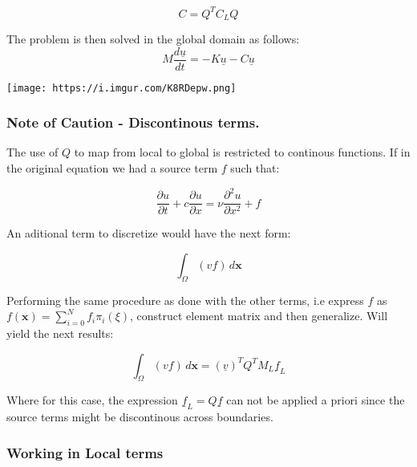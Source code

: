 \documentclass[
  a4paper,
  10pt]{article}
\begin{document}
\begin{equation}
C = Q^{T}C_LQ    
\end{equation}

The problem is then solved in the global domain as follows:
\begin{equation}
M\frac{d\underline{u}}{dt}=-K\underline{u}-C\underline{u}
\end{equation}

\texttt{[image: https://i.imgur.com/K8RDepw.png]}

\hypertarget{note-of-caution---discontinous-terms.}{%
\subsubsection{Note of Caution - Discontinous
terms.}\label{note-of-caution---discontinous-terms.}}

The use of \(Q\) to map from local to global is restricted to continous
functions. If in the original equation we had a source term \(f\) such
that:

\begin{equation}
\frac{\partial{u}}{\partial{t}} + c \frac{\partial{u}}{\partial{x}} =  \nu \frac{\partial^{2}u}{\partial{x}^{2}}+f
\end{equation}

An aditional term to discretize would have the next form:

\begin{equation}
        \int_{\Omega} (v f) \,d\textbf{x}        
\end{equation}

Performing the same procedure as done with the other terms, i.e express
\(f\) as \(f(\textbf{x})=\sum_{i=0}^{N}f_{i} \pi_{i}(\xi)\), construct
element matrix and then generalize. Will yield the next results:

\begin{equation}
        \int_{\Omega} (v f) \,d\textbf{x} = (\underline{v})^{T}Q^{T}M_L\underline{f}_L        
\end{equation}

Where for this case, the expression \(\underline{f}_L=Q\underline{f}\)
can not be applied a priori since the source terms might be discontinous
across boundaries.

\hypertarget{working-in-local-terms}{%
\subsubsection{Working in Local terms}\label{working-in-local-terms}}
\end{document}
